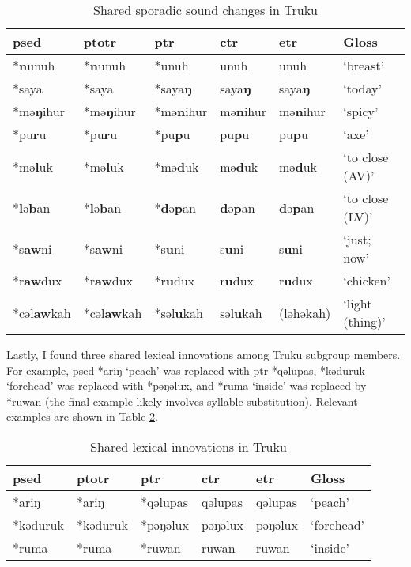 \begin{table}[!hbtp]
\centering
\caption{Shared sporadic sound changes in Truku}
\label{tab:tr_sp}
\begin{tabular}{llllll}
\hline
\ac{psed}      & \ac{ptotr}   & \ac{ptr}     & \acs{ctr}   & \acs{etr}   & Gloss               \\ \hline
*\textbf{n}unuh  & *\textbf{n}unuh  & *unuh    & unuh    & unuh    & `breast'        \\
*saya   & *saya   & *saya\textbf{ŋ}   & saya\textbf{ŋ}   & saya\textbf{ŋ}   & `today'         \\
*mə\textbf{ŋ}ihur& *mə\textbf{ŋ}ihur& *mə\textbf{n}ihur & mə\textbf{n}ihur & mə\textbf{n}ihur & `spicy'        \\
*pu\textbf{r}u   & *pu\textbf{r}u   & *pu\textbf{p}u    & pu\textbf{p}u    & pu\textbf{p}u    & `axe'           \\
*mə\textbf{l}uk  & *mə\textbf{l}uk  & *mə\textbf{d}uk   & mə\textbf{d}uk   & mə\textbf{d}uk   & `to close (AV)' \\
*\textbf{l}ə\textbf{b}an  & *\textbf{l}ə\textbf{b}an  & *\textbf{d}ə\textbf{p}an   & \textbf{d}ə\textbf{p}an   & \textbf{d}ə\textbf{p}an   & `to close (LV)' \\ 
*s\textbf{aw}ni  & *s\textbf{aw}ni  & *s\textbf{u}ni    & s\textbf{u}ni    & s\textbf{u}ni    & `just; now'     \\
*r\textbf{aw}dux & *r\textbf{aw}dux & *r\textbf{u}dux   & r\textbf{u}dux   & r\textbf{u}dux   & `chicken'       \\ 
*cəl\textbf{aw}kah & *cəl\textbf{aw}kah & *səl\textbf{u}kah & səl\textbf{u}kah & (ləhəkah) & `light (thing)'\\ \hline
\end{tabular}
\end{table}

Lastly, I found three shared lexical innovations among Truku subgroup members. For example, \acl{psed} *ariŋ `peach' was replaced with \acl{ptr} *qəlupas, *kəduruk `forehead' was replaced with *pəŋəlux, and *ruma `inside' was replaced by *ruwan (the final example likely involves syllable substitution). Relevant examples are shown in Table \ref{tab:tr_lx}.

\begin{table}[!hbtp]
\centering
\caption{Shared lexical innovations in Truku}
\label{tab:tr_lx}
\begin{tabular}{llllll}
\hline
\ac{psed}      & \ac{ptotr}   & \ac{ptr}     & \acs{ctr}   & \acs{etr}   & Gloss               \\ \hline
*ariŋ   & *ariŋ   & *qəlupas & qəlupas & qəlupas & `peach'         \\
*kəduruk& *kəduruk& *pəŋəlux & pəŋəlux & pəŋəlux & `forehead'      \\
*ruma  & *ruma   & *ruwan   & ruwan   & ruwan   & `inside'        \\ \hline
\end{tabular}
\end{table}

